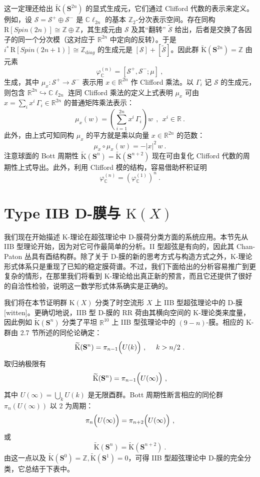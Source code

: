 \documentclass[11pt,a4paper]{ctexart}
\newcommand{\SrcRange}[2]{\marginpar{\raggedright\footnotesize 原文 p.#1}}
\begin{document}
这一定理还给出 \(\widetilde{{\mathrm K}}({\mathbf S}^{2n})\) 的显式生成元，它们通过 Clifford 代数的表示来定义。例如，设 \({\mathcal S}={\mathcal S}^+\oplus{\mathcal S}^-\) 是 \({\mathbb{C}}\ell_{2n}\) 的基本 \({\mathbb{Z}}_2\)-分次表示空间。存在同构 \({\mathrm R}[Spin(2n)]\cong{\mathbb{Z}}\oplus{\mathbb{Z}}\)，其生成元由 \({\mathcal S}\) 及其``翻转'' \(\widetilde{\mathcal S}\) 给出，后者是交换了各因子的同一个分次模（这对应于 \({\mathbb{R}}^{2n}\) 中定向的反转）。于是 \(i^*\,{\mathrm R}[Spin(2n+1)]\cong{\mathbb{Z}}_{\mathrm diag}\) 的生成元是 \([{\mathcal S}]+[\widetilde{\mathcal S}]\)。因此群 \(\widetilde{{\mathrm K}}({\mathbf
S}^{2n})={\mathbb{Z}}\) 由元素 \[\varphi_{{\mathbb{C}}}^{(n)}=[{\mathcal S}^+,{\mathcal S}^-;\mu]\ ,\] 生成，其中 \(\mu_x:{\mathcal S}^+\rightarrow {\mathcal S}^-\) 表示用 \(x\in{\mathbb{R}}^{2n}\) 作 Clifford 乘法。以 \(\Gamma_i\) 记 \({\mathcal S}\) 的生成元，则包含 \({\mathbb{R}}^{2n}\hookrightarrow {\mathbb{C}}\ell_{2n}\) 连同 Clifford 乘法的定义上式表明 \(\mu_x\) 可由 \(x=\sum_ix^i\,\Gamma_i\in{\mathbb{R}}^{2n}\) 的普通矩阵乘法表示： \[\mu_x(w)=\left(
\sum_{i=1}^{2n}x^i\,\Gamma_i\right)w\ \ , \ \ x^i\in{\mathbb{R}}\ .\] 此外，由上式可知同构 \(\mu_x\) 的平方就是乘以向量 \(x\in{\mathbb{R}}^{2n}\) 的范数： \[\mu_x\circ\mu_x(w)=-|x|^2\,w\ .\] 注意球面的 Bott 周期性 \(\widetilde{{\mathrm K}}({\mathbf S}^n)=\widetilde{{\mathrm K}}({\mathbf
S}^{n+2})\) 现在可由复化 Clifford 代数的周期性上式导出。此外，利用 Clifford 模的结构，容易借助杯积证明 \[\varphi_{{\mathbb{C}}}^{(n)}=\left(\varphi_{{\mathbb{C}}}^{(1)}
\right)^n\ .\]

\SrcRange{33}{33}
\section{\texorpdfstring{Type IIB D-膜与 \({\mathrm K}(X)\)}{Type IIB D-膜与 \{\textbackslash mathrm K\}(X)}}\label{type-iib-d-ux819cux4e0e-mathrm-kx}

我们现在开始描述 K-理论在超弦理论中 D-膜荷分类方面的系统应用。本节先从 IIB 型理论开始，因为对它可作最简单的分析。II 型超弦是有向的，因此其 Chan-Paton 丛具有酉结构群。除了关于 D-膜的新的思考方式与构造方式之外，K-理论形式体系只是重现了已知的稳定膜荷谱。不过，我们下面给出的分析容易推广到更复杂的情形，在那里我们将看到 K-理论给出真正新的预言，而且它还提供了很好的自洽性检验，说明这一数学形式体系确实是正确的。

我们将在本节证明群 \({\mathrm K}(X)\) 分类了时空流形 \(X\) 上 IIB 型超弦理论中的 D-膜 [witten]。更确切地说，IIB 型 D-膜的 RR 荷由其横向空间的 K-理论类来度量，因此例如 \(\widetilde{{\mathrm K}}({\mathbf S}^n)\) 分类了平坦 \({\mathbb{R}}^{10}\) 上 IIB 型弦理论中的 \((9-n)\)-膜。相应的 K-群由 2.7 节所述的同伦论确定： \[\widetilde{{\mathrm K}}({\mathbf S}^n)=\pi_{n-1}\Bigl(U(k)\Bigr)\ ,\ \ \ \ k>n/2\ .\] 取归纳极限有 \[\widetilde{{\mathrm K}}({\mathbf S}^n)=\pi_{n-1}\Bigl(U(\infty)\Bigr)\ ,\] 其中 \(U(\infty)=\bigcup_kU(k)\) 是无限酉群。Bott 周期性断言相应的同伦群 \(\pi_n(U(\infty))\) 以 2 为周期： \[\pi_n\Bigl(U(\infty)\Bigr)=\pi_{n+2}\Bigl(U(\infty)\Bigr)\ ,\] 或 \[\widetilde{{\mathrm K}}({\mathbf S}^n)=\widetilde{{\mathrm K}}({\mathbf S}^{n+2})\ .\] 由这一点以及 \(\widetilde{{\mathrm K}}({\mathbf S}^0)={\mathbb{Z}}, \widetilde{{\mathrm K}}({\mathbf S}^1)=0\)，可得 IIB 型超弦理论中 D-膜的完全分类，它总结于下表中。
\end{document}
